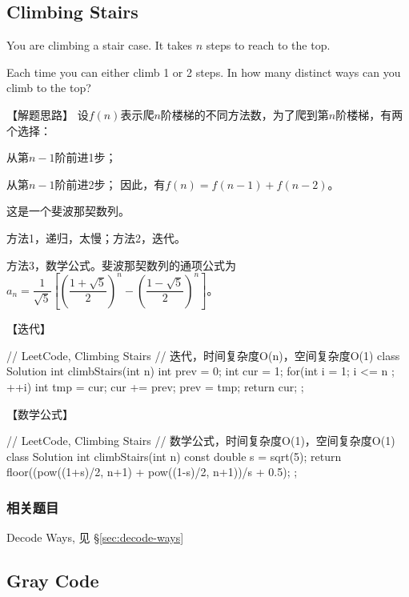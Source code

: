 \subsection{Climbing Stairs} %
\label{sec:climbing-stairs}



You are climbing a stair case. It takes $n$ steps to reach to the top.

Each time you can either climb 1 or 2 steps. In how many distinct ways can you
climb to the top?


【解题思路】
设$f(n)$表示爬$n$阶楼梯的不同方法数，为了爬到第$n$阶楼梯，有两个选择：
\begindot
\item 从第$n-1$阶前进1步；
\item 从第$n-1$阶前进2步；
\myenddot
因此，有$f(n)=f(n-1)+f(n-2)$。

这是一个斐波那契数列。

方法1，递归，太慢；方法2，迭代。

方法3，数学公式。斐波那契数列的通项公式为
$a_n=\dfrac{1}{\sqrt{5}}\left[\left(\dfrac{1+\sqrt{5}}{2}\right)^n-\left(\dfrac{1-\sqrt{5}}{2}\right)^n\right]$。


【迭代】
\begin{Code}
	// LeetCode, Climbing Stairs
	// 迭代，时间复杂度O(n)，空间复杂度O(1)
	class Solution {
		int climbStairs(int n) {
			int prev = 0;
			int cur = 1;
			for(int i = 1; i <= n ; ++i){
				int tmp = cur;
				cur += prev;
				prev = tmp;
			}
			return cur;
		}
	};
\end{Code}


【数学公式】
\begin{Code}
	// LeetCode, Climbing Stairs
	// 数学公式，时间复杂度O(1)，空间复杂度O(1)
	class Solution {
		int climbStairs(int n) {
			const double s = sqrt(5);
			return floor((pow((1+s)/2, n+1) + pow((1-s)/2, n+1))/s + 0.5);
		}
	};
\end{Code}


\subsubsection{相关题目}
\begindot
\item Decode Ways, 见 \S \ref{sec:decode-ways}
\myenddot


\subsection{Gray Code} %
\label{sec:gray-code}



